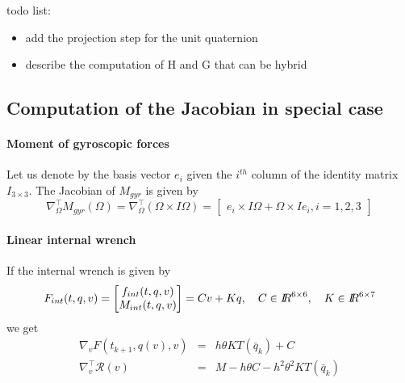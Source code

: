 \begin{ndrva}

  todo list:
  
  \begin{itemize}


  \item add the projection step for the unit quaternion

  \item describe the computation of H and G that can be hybrid

    
\end{itemize}

\end{ndrva}


\subsection{Computation of the Jacobian in special case}

\paragraph{Moment of gyroscopic forces}
Let us denote by the basis vector $e_i$ given the $i^{th}$ column of the identity matrix $I_{3\times3}$. The Jacobian of $M_{gyr}$ is given by
\begin{equation}
  \label{eq:8}
  \nabla^\top_\Omega M_{gyr}(\Omega) = \nabla^\top_\Omega (\Omega \times I \Omega) =
  \begin{bmatrix}
    e_i \times I \Omega + \Omega \times I e_i, i =1,2,3
  \end{bmatrix}
\end{equation}

\paragraph{Linear internal wrench}
If the internal wrench  is given by
\begin{equation}
  \label{eq:9}
  F_{int}(t,q,v) =
  \begin{bmatrix}
    f_{int}(t,q,v)\\
    M_{int}(t,q,v)
  \end{bmatrix}
  = C v + K q, \quad C \in \mbox{\rm $I\!\!R$}^{6\times 6}, \quad K \in \mbox{\rm $I\!\!R$}^{6\times 7 }
\end{equation}
we get
\begin{equation}
  \label{eq:6}
  \begin{array}{lcl}
    \nabla_v F(t_{k+1}, q(v),v)  &=& h \theta K T(\bar q_k) + C \\
    \nabla^\top_v \mathcal R(v) &=& M - h \theta C - h^2 \theta^2 K T(\bar q_k)
  \end{array}
\end{equation}

